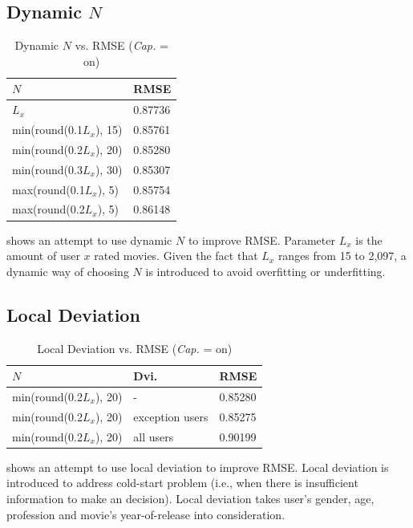 \documentclass{ece}
\begin{document}
\subsection{Dynamic $N$}

\begin{table}[h]
    \caption[Dynamic $N$ vs. RMSE]{Dynamic $N$ vs. RMSE (\textit{Cap.} = on)}
    \label{tab:table-4}
    \centering
\begin{tabular}{|l|l|}
\hline
$N$            & RMSE    \\ \hline
$L_x$                    & 0.87736 \\ \hline
min(round(0.1$L_x$), 15) & 0.85761 \\ \hline
min(round(0.2$L_x$), 20) & 0.85280 \\ \hline
min(round(0.3$L_x$), 30) & 0.85307 \\ \hline
max(round(0.1$L_x$), 5)  & 0.85754 \\ \hline
max(round(0.2$L_x$), 5)  & 0.86148 \\ \hline
\end{tabular}
\end{table}

 shows an attempt to use dynamic $N$ to improve RMSE.
Parameter $L_x$ is the amount of user $x$ rated movies.
Given the fact that $L_x$ ranges from 15 to 2,097, a dynamic way of choosing $N$ is introduced to avoid overfitting or underfitting.

\subsection{Local Deviation}

\begin{table}[h]
    \caption[Local Deviation vs. RMSE]{Local Deviation vs. RMSE (\textit{Cap.} = on)}
    \label{tab:table-5}
    \centering
\begin{tabular}{|l|l|l|}
\hline
$N$                        & Dvi.            & RMSE    \\ \hline
min(round(0.2$L_x$), 20) & -               & 0.85280 \\ \hline
min(round(0.2$L_x$), 20) & exception users & 0.85275 \\ \hline
min(round(0.2$L_x$), 20) & all users       & 0.90199 \\ \hline
\end{tabular}
\end{table}

 shows an attempt to use local deviation to improve RMSE.
Local deviation is introduced to address cold-start problem (i.e., when there is insufficient information to make an decision).
Local deviation takes user's gender, age, profession and movie's year-of-release into consideration.
\end{document}
